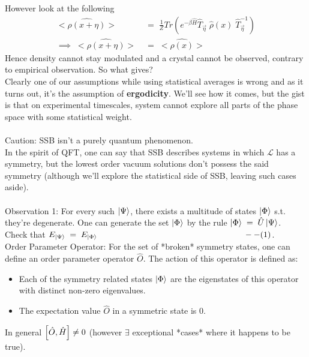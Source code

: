 \documentclass[12pt]{article}
\begin{document}
However look at the following
\begin{align*}
    <\hat{\rho(x+\eta)}> &= \;\frac{1}{Z}Tr(e^{-\beta \hat{H}}\hat{T}_{\Vec{\eta}}\;\hat{\rho}(x)\;\hat{T}^{-1}_{\Vec{\eta}} ) \\
    \implies\; <\hat{\rho(x+\eta)}>\;&=\; <\hat{\rho(x)}>
\end{align*}
Hence density cannot stay modulated and a crystal cannot be observed, contrary to empirical observation. So what gives?\\
Clearly one of our assumptions while using statistical averages is wrong and as it turns out, it's the assumption of \textbf{ergodicity}. We'll see how it comes, but the gist is that on experimental timescales, system cannot explore all parts of the phase space with some statistical weight.\\
\\
Caution: SSB isn't a purely quantum phenomenon.\\
\newline
In the spirit of QFT, one can say that SSB describes systems in which $\mathcal{L}$ has a symmetry, but the lowest order vacuum solutions don't possess the said symmetry (although we'll explore the statistical side of SSB, leaving such cases aside).\\
\\
Observation 1: For every such $\ket{\Psi}$, there exists a multitude of states $\ket{\Phi}$ s.t. they're degenerate.
One can generate the set {$\ket{\Phi}$} by the rule $\ket{\Phi}\;=\;\hat{U}\ket{\Psi}$.\\
Check that $E_{\ket{\Psi}}\;=\;E_{\ket{\Phi}}\;\;\;\;\;\;\;\;\;\;\;\;\;\;\;\;\;\;\;\;\;\;\;\;\;\;\;\;\;\;\;\;\;\;\;\;\;\;\;\;\;\;\;\;\;\;\;\;\;\;\;\;\;\;\;\;\;\;\;\;\;\;\;--(1)$.\\
\newline
Order Parameter Operator: For the set of *broken* symmetry states, one can define an order parameter operator $\hat{O}$.
The action of this operator is defined as:
\begin{itemize}
    \item
        Each of the symmetry related states {$\ket{\Phi}$} are the eigenstates of this operator with distinct non-zero eigenvalues.
    \item The expectation value $\hat{O}$ in a symmetric state is 0.
\end{itemize}
In general $\comm{\hat{O}}{\hat{H}}\neq 0$ (however $\exists$ exceptional *cases* where it happens to be true).\\
\end{document}
